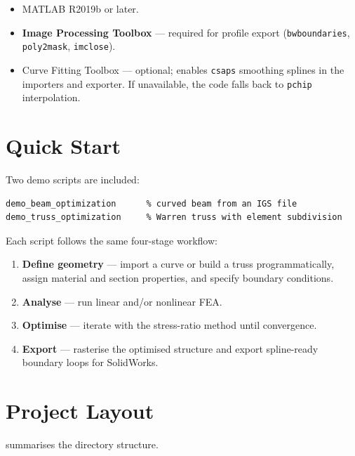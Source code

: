 \begin{itemize}[nosep]
    \item MATLAB R2019b or later.
    \item \textbf{Image Processing Toolbox} --- required for profile export
          (\texttt{bwboundaries}, \texttt{poly2mask}, \texttt{imclose}).
    \item Curve Fitting Toolbox --- optional; enables \texttt{csaps} smoothing
          splines in the importers and exporter.  If unavailable, the code
          falls back to \texttt{pchip} interpolation.
\end{itemize}

\section{Quick Start}

Two demo scripts are included:

\begin{lstlisting}
demo_beam_optimization      % curved beam from an IGS file
demo_truss_optimization     % Warren truss with element subdivision
\end{lstlisting}

Each script follows the same four-stage workflow:

\begin{enumerate}[nosep]
    \item \textbf{Define geometry} --- import a curve or build a truss
          programmatically, assign material and section properties, and
          specify boundary conditions.
    \item \textbf{Analyse} --- run linear and/or nonlinear FEA.
    \item \textbf{Optimise} --- iterate with the stress-ratio method until
          convergence.
    \item \textbf{Export} --- rasterise the optimised structure and export
          spline-ready boundary loops for SolidWorks.
\end{enumerate}

\section{Project Layout}

 summarises the directory structure.

